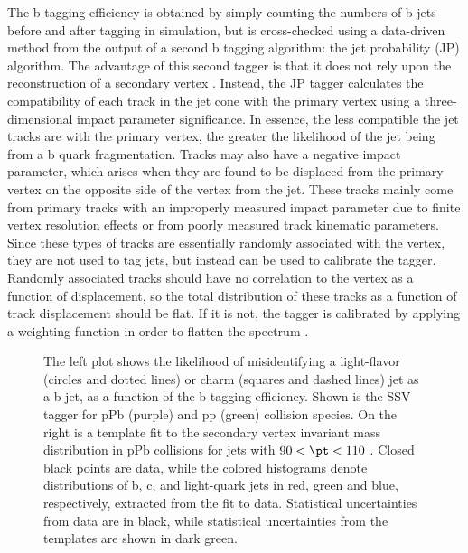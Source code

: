 The b tagging efficiency is obtained by simply counting the numbers of b jets before and after tagging in simulation, but is cross-checked using a data-driven method from the output of a second b tagging algorithm: the jet probability (JP) algorithm.
The advantage of this second tagger is that it does not rely upon the reconstruction of a secondary vertex \cite{Chatrchyan:2012jua}.  Instead, the JP tagger calculates the compatibility of each track in the jet cone with the primary vertex using a three-dimensional impact parameter significance.  In essence, the less compatible the jet tracks are with the primary vertex, the greater the likelihood of the jet being from a b quark fragmentation.  Tracks may also have a negative impact parameter, which arises when they are found to be displaced from the primary vertex on the opposite side of the vertex from the jet.  These tracks mainly come from primary tracks with an improperly measured impact parameter due to finite vertex resolution effects or from poorly measured track kinematic parameters.  Since these types of tracks are essentially randomly associated with the vertex, they are not used to tag jets, but instead can be used to calibrate the tagger.  Randomly associated tracks should have no correlation to the vertex as a function of displacement, so the total distribution of these tracks as a function of track displacement should be flat.  If it is not, the tagger is calibrated by applying a weighting function in order to flatten the spectrum \cite{Chatrchyan:2012jua}.

\begin{figure}[htb]
\begin{center}
\caption{\label{fig:eff_vs_mistag}
The left plot shows the likelihood of misidentifying a light-flavor (circles and dotted lines) or charm (squares and dashed lines) jet as a b jet, as a function of the b tagging efficiency.  Shown is the SSV tagger for pPb (purple) and pp (green) collision species.  On the right is a template fit to the secondary vertex invariant mass distribution in pPb collisions for jets with $90 < \pt < 110$ \GeVc. Closed black points are data, while the colored histograms denote distributions of b, c, and light-quark jets in red, green and blue, respectively, extracted from the fit to data. Statistical uncertainties from data are in black, while statistical uncertainties from the templates are shown in dark green.
}
\end{center}
\end{figure}


